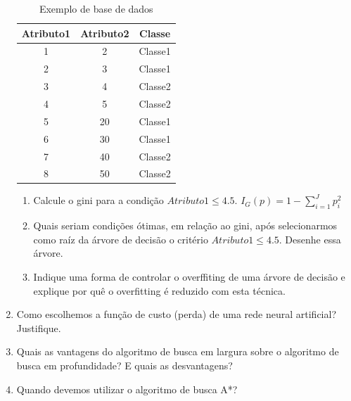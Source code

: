 \documentclass{article}
\begin{document}
\begin{enumerate}
\begin{table}[h!]
    \centering
    \begin{tabular}{|c|c|c|}
    \hline
    \textbf{Atributo1} & \textbf{Atributo2} & \textbf{Classe} \\
    \hline
    1 & 2 & Classe1 \\
    2 & 3 & Classe1 \\
    3 & 4 & Classe2 \\
    4 & 5 & Classe2 \\
    5 & 20 & Classe1 \\
    6 & 30 & Classe1 \\
    7 & 40 & Classe2 \\
    8 & 50 & Classe2 \\
    \hline
    \end{tabular}
    \caption{Exemplo de base de dados}
    \label{tab:exemplo}
\end{table}

\begin{enumerate}
    \item Calcule o gini para a condição $Atributo1 \leq 4.5$. $I_{G}(p) = 1 - \sum_{i=1}^{J} p_{i}^{2}$
    \item Quais seriam condições ótimas, em relação ao gini, após selecionarmos como raíz da árvore de decisão o critério $Atributo1 \leq 4.5$. Desenhe essa árvore.
    \item Indique uma forma de controlar o overffiting de uma árvore de decisão e explique por quê o overfitting é reduzido com esta técnica. 
\end{enumerate}



\item Como escolhemos a função de custo (perda) de uma rede neural artificial? Justifique.

\item Quais as vantagens do algoritmo de busca em largura sobre o algoritmo de busca em profundidade? E quais as desvantagens?

\item Quando devemos utilizar o algoritmo de busca A*?

\end{enumerate}
\end{document}
